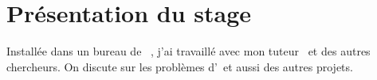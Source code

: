 \section{Présentation du stage}

Installée dans un bureau de \msh\ , j'ai travaillé avec mon tuteur \tls\ et des autres chercheurs. On discute sur les problèmes d'\ezb\ et aussi des autres projets. 